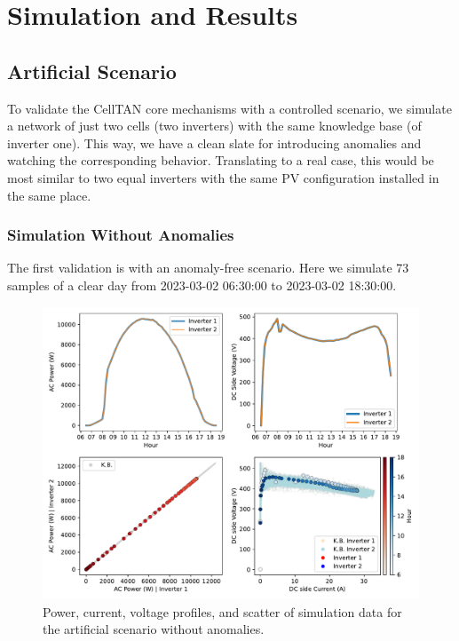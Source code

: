 
\section{Simulation and Results} \label{subsec:results}

\subsection{Artificial Scenario}

To validate the CellTAN core mechanisms with a controlled scenario, we simulate a network of just two cells (two inverters) with the same knowledge base (of inverter one). This way, we have a clean slate for introducing anomalies and watching the corresponding behavior. Translating to a real case, this would be most similar to two equal inverters with the same PV configuration installed in the same place.

\subsubsection{Simulation Without Anomalies}

The first validation is with an anomaly-free scenario. Here we simulate 73 samples of a clear day from 2023-03-02 06:30:00 to 2023-03-02 18:30:00.

\begin{figure}[h!]
    \centering
    \includegraphics[width=\textwidth]{figures/chapter5/results/artificial/40_test_clone_01.pdf}
    \caption{Power, current, voltage profiles, and scatter of simulation data for the artificial scenario without anomalies.}
    \label{fig:artificial_01_piv}
\end{figure}

